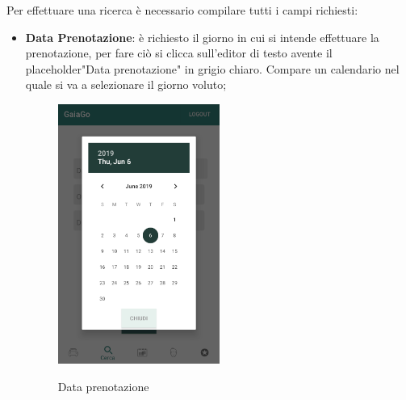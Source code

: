 Per effettuare una ricerca è necessario compilare tutti i campi richiesti:
\begin{itemize}
	\item \textbf{Data Prenotazione}: è richiesto il giorno in cui si intende effettuare la prenotazione, per fare ciò si clicca sull'editor di testo avente il placeholder\glosp "Data prenotazione" in grigio chiaro. Compare un calendario nel quale si va a selezionare il giorno voluto;
	 \begin{figure}[H] 
	 	\centering 
	 	\includegraphics[width=0.5\textwidth]{res/images/data_prenotazione.png}\\
	 	\caption{Data prenotazione}
	 	\label{data}
	 \end{figure}
 \pagebreak
 

\end{itemize}
